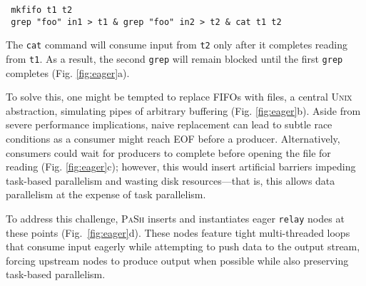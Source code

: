 \documentclass[sigplan, review, screen, anonymous]{acmart}
\newcommand{\ttt}[1]{\texttt{#1}}
\newcommand{\TODO}[1]{\hl{\textbf{TODO:} #1}\xspace}
\newcommand{\sys}{{\scshape PaSh}\xspace}
\newcommand{\unix}{{\scshape Unix}\xspace}
\begin{document}
\begin{verbatim}
 mkfifo t1 t2
 grep "foo" in1 > t1 & grep "foo" in2 > t2 & cat t1 t2
\end{verbatim}

\noindent
The \ttt{cat} command will consume input from \ttt{t2} only after it completes reading from \ttt{t1}.
As a result, the second \ttt{grep} will remain blocked until the first \ttt{grep} completes (Fig. \ref{fig:eager}a). %

To solve this, one might be tempted to replace FIFOs with files, a central \unix abstraction, simulating pipes of arbitrary buffering (Fig. \ref{fig:eager}b).
Aside from severe performance implications, naive replacement can lead to subtle race conditions as a consumer might reach {\sc EOF} before a producer.
Alternatively, consumers could wait for producers to complete before opening the file for reading (Fig. \ref{fig:eager}c);
  however, this would insert artificial barriers impeding task-based parallelism and wasting disk resources---that is, this allows data parallelism at the expense of task parallelism.

To address this challenge,
  \sys inserts and instantiates eager \ttt{relay} nodes at these points (Fig.~\ref{fig:eager}d). %
These nodes feature tight multi-threaded loops that consume input eagerly while attempting to push data to the output stream, forcing upstream nodes to produce output when possible while also preserving task-based parallelism.


\end{document}
